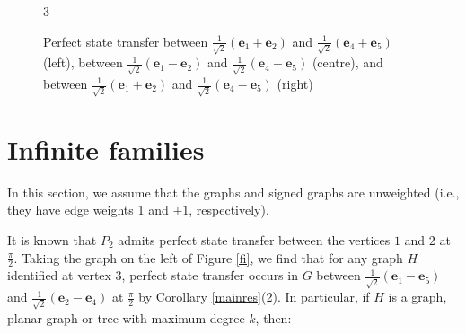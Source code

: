 \documentclass[12pt,a4paper]{article}
\def \e {{\bf e}}
\def \e {{\mathbf e}}
\begin{document}
\begin{figure}
\begin{multicols}{3}
\begin{center}
\begin{tikzpicture}[scale=0.6,auto=center]
\end{tikzpicture}

                \end{center}
\end{multicols}
		\caption{Perfect state transfer between $\frac{1}{\sqrt2}(\e_1+\e_2)$ and $\frac{1}{\sqrt2}(\e_4+\e_5)$ (left), between $\frac{1}{\sqrt2}(\e_1-\e_2)$ and $\frac{1}{\sqrt2}(\e_4-\e_5)$ (centre), and between $\frac{1}{\sqrt2}(\e_1+\e_2)$ and $\frac{1}{\sqrt2}(\e_4-\e_5)$ (right)}
  \label{3fig1}
	\end{figure} 

\section{Infinite families}\label{sec:inf}

In this section, we assume that the graphs and signed graphs are unweighted (i.e., they have edge weights 1 and $\pm 1$, respectively).

It is known that $P_2$ admits perfect state transfer between the vertices $1$ and $2$ at $\frac{\pi}{2}$. Taking the graph on the left of Figure \ref{fi}, 
we find that for any graph $H$ identified at vertex 3, perfect state transfer occurs in $G$ between $\frac{1}{\sqrt2}(\e_1-\e_5)$ and $\frac{1}{\sqrt2}(\e_2-\e_4)$ at $\frac{\pi}{2}$ by Corollary \ref{mainres}(2). %
In particular, if $H$ is a graph, planar graph or tree with maximum degree $k$, then:
\end{document}
